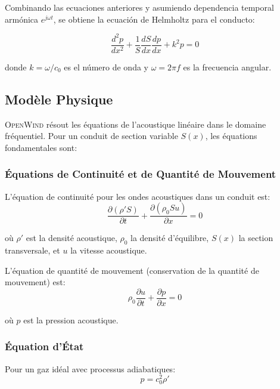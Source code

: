 \documentclass[12pt,a4paper,twocolumn]{article}
\newcommand{\openwind}{\textsc{OpenWind}}
\begin{document}
Combinando las ecuaciones anteriores y asumiendo dependencia temporal armónica $e^{j\omega t}$, se obtiene la ecuación de Helmholtz para el conducto:

\begin{equation}
\frac{d^2 p}{dx^2} + \frac{1}{S}\frac{dS}{dx}\frac{dp}{dx} + k^2 p = 0
\label{eq:helmholtz}
\end{equation}

donde $k = \omega/c_0$ es el número de onda y $\omega = 2\pi f$ es la frecuencia angular.

\subsection{Modèle Physique}

\openwind{} résout les équations de l'acoustique linéaire dans le domaine fréquentiel. Pour un conduit de section variable $S(x)$, les équations fondamentales sont:

\subsubsection{Équations de Continuité et de Quantité de Mouvement}

L'équation de continuité pour les ondes acoustiques dans un conduit est:
\begin{equation}
\frac{\partial (\rho' S)}{\partial t} + \frac{\partial (\rho_0 S u)}{\partial x} = 0
\end{equation}

où $\rho'$ est la densité acoustique, $\rho_0$ la densité d'équilibre, $S(x)$ la section transversale, et $u$ la vitesse acoustique.

L'équation de quantité de mouvement (conservation de la quantité de mouvement) est:
\begin{equation}
\rho_0 \frac{\partial u}{\partial t} + \frac{\partial p}{\partial x} = 0
\end{equation}

où $p$ est la pression acoustique.

\subsubsection{Équation d'État}

Pour un gaz idéal avec processus adiabatiques:
\begin{equation}
p = c_0^2 \rho'
\end{equation}
\end{document}
